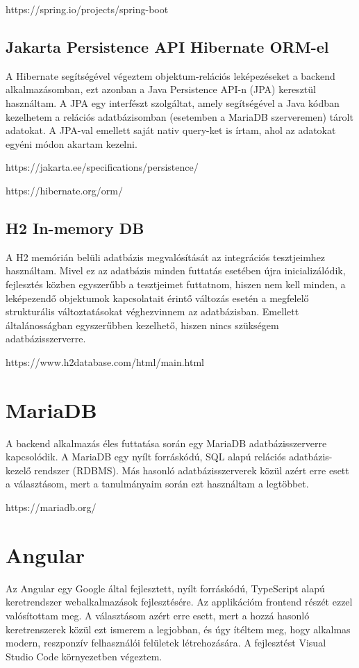 \documentclass[a4paper,12pt]{report}
\theoremstyle{definition}
\theoremstyle{remark}
\begin{document}
https://spring.io/projects/spring-boot
	\subsection{Jakarta Persistence API Hibernate ORM-el}

A Hibernate segítségével végeztem objektum-relációs leképezéseket a backend alkalmazásomban, ezt azonban a Java Persistence API-n (JPA) keresztül használtam. A JPA egy interfészt szolgáltat, amely segítségével a Java kódban kezelhetem a relációs adatbázisomban (esetemben a MariaDB szerveremen) tárolt adatokat. A JPA-val emellett saját nativ query-ket is írtam, ahol az adatokat egyéni módon akartam kezelni.

https://jakarta.ee/specifications/persistence/

https://hibernate.org/orm/
	\subsection{H2 In-memory DB}

A H2 memórián belüli adatbázis megvalósítását az integrációs tesztjeimhez használtam. Mivel ez az adatbázis minden futtatás esetében újra inicializálódik, fejlesztés közben egyszerűbb a tesztjeimet futtatnom, hiszen nem kell minden, a leképezendő objektumok kapcsolatait érintő változás esetén a megfelelő strukturális változtatásokat véghezvinnem az adatbázisban. Emellett általánosságban egyszerűbben kezelhető, hiszen nincs szükségem adatbázisszerverre.

https://www.h2database.com/html/main.html

\section{MariaDB}

A backend alkalmazás éles futtatása során egy MariaDB adatbázisszerverre kapcsolódik. A MariaDB egy nyílt forráskódú, SQL alapú relációs adatbázis-kezelő rendszer (RDBMS). Más hasonló adatbázisszerverek közül azért erre esett a választásom, mert a tanulmányaim során ezt használtam a legtöbbet.

https://mariadb.org/

\section{Angular}

Az Angular egy Google által fejlesztett, nyílt forráskódú, TypeScript alapú keretrendszer webalkalmazások fejlesztésére. Az applikációm frontend részét ezzel valósítottam meg. A választásom azért erre esett, mert a hozzá hasonló keretrenszerek közül ezt ismerem a legjobban, és úgy ítéltem meg, hogy alkalmas modern, reszponzív felhasználói felületek létrehozására. A fejlesztést Visual Studio Code környezetben végeztem.
\end{document}

